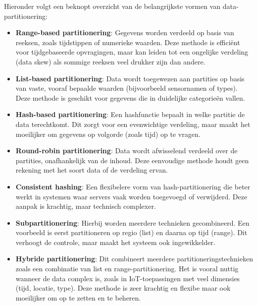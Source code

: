 Hieronder volgt een beknopt overzicht van de belangrijkste vormen van data-partitionering:

\begin{itemize}
    \item \textbf{Range-based partitionering}: Gegevens worden verdeeld op basis van reeksen, zoals tijdstippen of numerieke waarden. Deze methode is efficiënt voor tijdgebaseerde opvragingen, maar kan leiden tot een ongelijke verdeling (data skew) als sommige reeksen veel drukker zijn dan andere.
    
    \item \textbf{List-based partitionering}: Data wordt toegewezen aan partities op basis van vaste, vooraf bepaalde waarden (bijvoorbeeld sensornamen of types). Deze methode is geschikt voor gegevens die in duidelijke categorieën vallen.
    
    \item \textbf{Hash-based partitionering}: Een hashfunctie bepaalt in welke partitie de data terechtkomt. Dit zorgt voor een evenwichtige verdeling, maar maakt het moeilijker om gegevens op volgorde (zoals tijd) op te vragen.
    
    \item \textbf{Round-robin partitionering}: Data wordt afwisselend verdeeld over de partities, onafhankelijk van de inhoud. Deze eenvoudige methode houdt geen rekening met het soort data of de verdeling ervan.
    
    \item \textbf{Consistent hashing}: Een flexibelere vorm van hash-partitionering die beter werkt in systemen waar servers vaak worden toegevoegd of verwijderd. Deze aanpak is krachtig, maar technisch complexer.
    
    \item \textbf{Subpartitionering}: Hierbij worden meerdere technieken gecombineerd. Een voorbeeld is eerst partitioneren op regio (list) en daarna op tijd (range). Dit verhoogt de controle, maar maakt het systeem ook ingewikkelder.

    \item \textbf{Hybride partitionering}: Dit combineert meerdere partitioneringstechnieken zoals een combinatie van list en range-partitionering. Het is vooral nuttig wanneer de data complex is, zoals in IoT-toepassingen met veel dimensies (tijd, locatie, type). Deze methode is zeer krachtig en flexibe maar ook moeilijker om op te zetten en te beheren.
\end{itemize}

